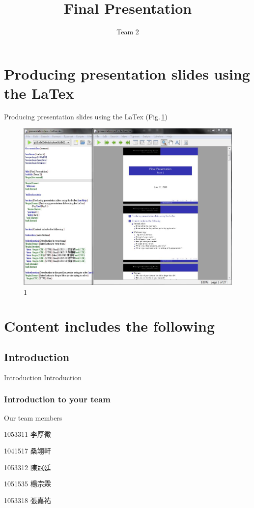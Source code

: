\documentclass{beamer}
\title{Final Presentation}
\subtitle{Team 2}
\begin{document}
\begin{frame}
  \titlepage
\end{frame}

 \tableofcontents

\section{Producing presentation slides using the LaTex \medskip}
\begin{frame}{Producing presentation slides using the LaTex}
	(Fig.\,\ref{fig:1})
    \begin{figure}
  \includegraphics[width=0.7\linewidth]{latex.jpg}
    \caption{1}
    \label{fig:1}
  \end{figure}
\end{frame}


\section{Content includes the following }

\subsection{Introduction}

\begin{frame}{Introduction}
\center \huge Introduction
\end{frame} 


\subsubsection{Introduction to your team}
\begin{frame}{Our team members}
\begin{itemize}
\begin{CJK}{UTF8}{bkai}
  \item   1053311 李厚徵
  \item   1041517 桑翊軒
  \item   1053312 陳冠廷
  \item   1051535 楊宗霖
  \item   1053318 張嘉祐
\end{CJK}
\end{itemize}
\end{frame}
\end{document}
